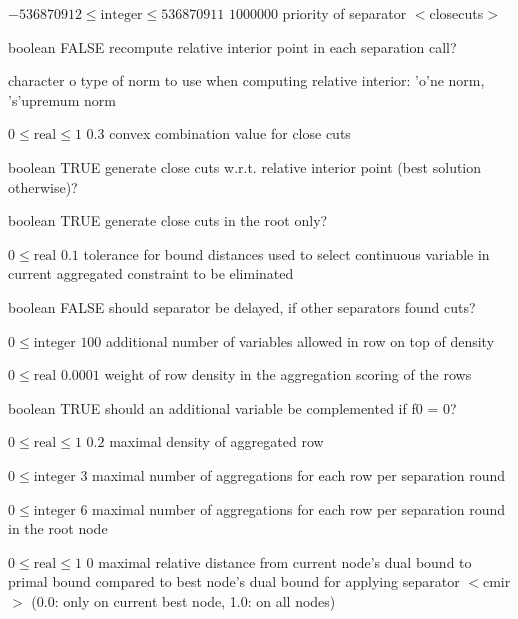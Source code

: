 %
{$-536870912\leq\textrm{integer}\leq536870911$}%
{$1000000$}%
{priority of separator $<$closecuts$>$}%
{}

%
{boolean}%
{FALSE}%
{recompute relative interior point in each separation call?}%
{}

%
{character}%
{o}%
{type of norm to use when computing relative interior: 'o'ne norm, 's'upremum norm}%
{}

%
{$0\leq\textrm{real}\leq1$}%
{$0.3$}%
{convex combination value for close cuts}%
{}

%
{boolean}%
{TRUE}%
{generate close cuts w.r.t. relative interior point (best solution otherwise)?}%
{}

%
{boolean}%
{TRUE}%
{generate close cuts in the root only?}%
{}

%
{$0\leq\textrm{real}$}%
{$0.1$}%
{tolerance for bound distances used to select continuous variable in current aggregated constraint to be eliminated}%
{}

%
{boolean}%
{FALSE}%
{should separator be delayed, if other separators found cuts?}%
{}

%
{$0\leq\textrm{integer}$}%
{$100$}%
{additional number of variables allowed in row on top of density}%
{}

%
{$0\leq\textrm{real}$}%
{$0.0001$}%
{weight of row density in the aggregation scoring of the rows}%
{}

%
{boolean}%
{TRUE}%
{should an additional variable be complemented if f0 = 0?}%
{}

%
{$0\leq\textrm{real}\leq1$}%
{$0.2$}%
{maximal density of aggregated row}%
{}

%
{$0\leq\textrm{integer}$}%
{$3$}%
{maximal number of aggregations for each row per separation round}%
{}

%
{$0\leq\textrm{integer}$}%
{$6$}%
{maximal number of aggregations for each row per separation round in the root node}%
{}

%
{$0\leq\textrm{real}\leq1$}%
{$0$}%
{maximal relative distance from current node's dual bound to primal bound compared to best node's dual bound for applying separator $<$cmir$>$ (0.0: only on current best node, 1.0: on all nodes)}%
{}

